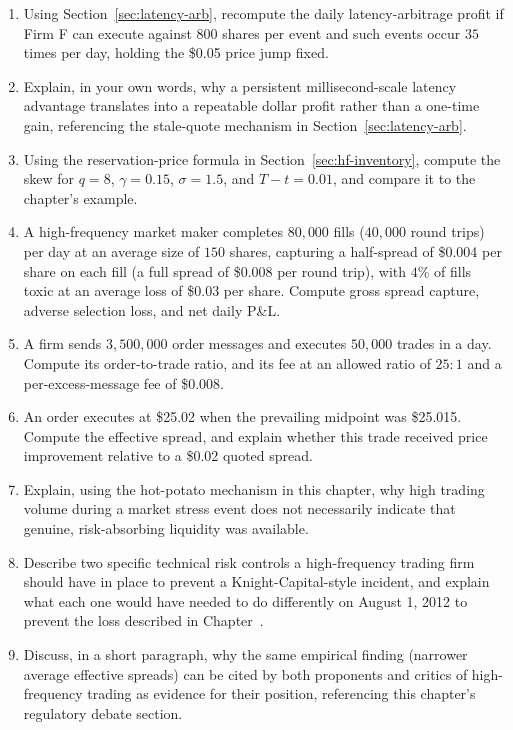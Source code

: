 \documentclass[../ai_in_finance]{subfiles}
\begin{document}
\begin{enumerate}[exercises]
    \item Using Section~\ref{sec:latency-arb}, recompute the daily latency-arbitrage profit if Firm F can execute against $800$ shares per event and such events occur $35$ times per day, holding the \$0.05 price jump fixed.
    \item Explain, in your own words, why a persistent millisecond-scale latency advantage translates into a repeatable dollar profit rather than a one-time gain, referencing the stale-quote mechanism in Section~\ref{sec:latency-arb}.
    \item Using the reservation-price formula in Section~\ref{sec:hf-inventory}, compute the skew for $q=8$, $\gamma=0.15$, $\sigma=1.5$, and $T-t=0.01$, and compare it to the chapter's example.
    \item A high-frequency market maker completes $80{,}000$ fills ($40{,}000$ round trips) per day at an average size of $150$ shares, capturing a half-spread of \$0.004 per share on each fill (a full spread of \$0.008 per round trip), with $4\%$ of fills toxic at an average loss of \$0.03 per share. Compute gross spread capture, adverse selection loss, and net daily P\&L.
    \item A firm sends $3{,}500{,}000$ order messages and executes $50{,}000$ trades in a day. Compute its order-to-trade ratio, and its fee at an allowed ratio of $25{:}1$ and a per-excess-message fee of \$0.008.
    \item An order executes at \$25.02 when the prevailing midpoint was \$25.015. Compute the effective spread, and explain whether this trade received price improvement relative to a \$0.02 quoted spread.
    \item Explain, using the hot-potato mechanism in this chapter, why high trading volume during a market stress event does not necessarily indicate that genuine, risk-absorbing liquidity was available.
    \item Describe two specific technical risk controls a high-frequency trading firm should have in place to prevent a Knight-Capital-style incident, and explain what each one would have needed to do differently on August 1, 2012 to prevent the loss described in Chapter~.
    \item Discuss, in a short paragraph, why the same empirical finding (narrower average effective spreads) can be cited by both proponents and critics of high-frequency trading as evidence for their position, referencing this chapter's regulatory debate section.

\end{enumerate}
\end{document}
